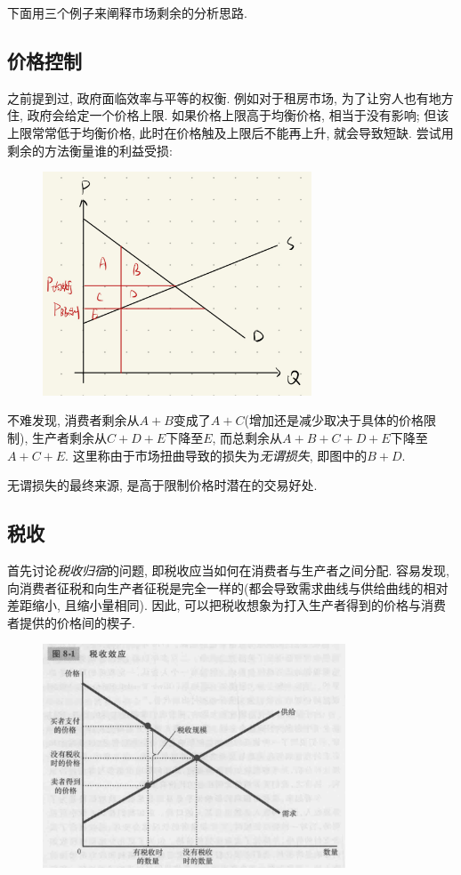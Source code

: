 下面用三个例子来阐释市场剩余的分析思路. 

\subsection{价格控制}

之前提到过, 政府面临效率与平等的权衡. 例如对于租房市场, 为了让穷人也有地方住, 政府会给定一个价格上限. 如果价格上限高于均衡价格, 相当于没有影响; 但该上限常常低于均衡价格, 此时在价格触及上限后不能再上升, 就会导致短缺. 尝试用剩余的方法衡量谁的利益受损: 

\begin{figure}[H]
	\centering
	\includegraphics[width=8cm]{attachment/IMG_3835.jpg}
\end{figure}

不难发现, 消费者剩余从$A+B$变成了$A+C$(增加还是减少取决于具体的价格限制), 生产者剩余从$C+D+E$下降至$E$, 而总剩余从$A+B+C+D+E$下降至$A+C+E$. 这里称由于市场扭曲导致的损失为\textit{无谓损失}, 即图中的$B+D$. 

无谓损失的最终来源, 是高于限制价格时潜在的交易好处. 

\subsection{税收}

首先讨论\textit{税收归宿}的问题, 即税收应当如何在消费者与生产者之间分配. 容易发现, 向消费者征税和向生产者征税是完全一样的(都会导致需求曲线与供给曲线的相对差距缩小, 且缩小量相同). 因此, 可以把税收想象为打入生产者得到的价格与消费者提供的价格间的楔子. 

\begin{figure}[H]
	\centering
	\includegraphics[width=9cm]{attachment/Fig8_1.png}
\end{figure}

